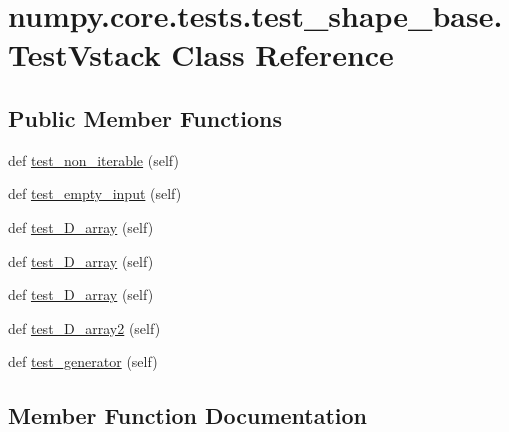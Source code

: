 \hypertarget{classnumpy_1_1core_1_1tests_1_1test__shape__base_1_1TestVstack}{}\section{numpy.\+core.\+tests.\+test\+\_\+shape\+\_\+base.\+Test\+Vstack Class Reference}
\label{classnumpy_1_1core_1_1tests_1_1test__shape__base_1_1TestVstack}
\subsection*{Public Member Functions}
\begin{DoxyCompactItemize}
\item 
def \hyperlink{classnumpy_1_1core_1_1tests_1_1test__shape__base_1_1TestVstack_a5e4099aa235d6b5fb95193a7cf2644e0}{test\+\_\+non\+\_\+iterable} (self)
\item 
def \hyperlink{classnumpy_1_1core_1_1tests_1_1test__shape__base_1_1TestVstack_a23dcd2e2281d12b0765589524287f886}{test\+\_\+empty\+\_\+input} (self)
\item 
def \hyperlink{classnumpy_1_1core_1_1tests_1_1test__shape__base_1_1TestVstack_ad06544a511cf11d5de3a956b7f20e661}{test\+\_\+D\+\_\+array} (self)
\item 
def \hyperlink{classnumpy_1_1core_1_1tests_1_1test__shape__base_1_1TestVstack_aba83d785f9d8cd5c15ff07dda5c37026}{test\+\_\+D\+\_\+array} (self)
\item 
def \hyperlink{classnumpy_1_1core_1_1tests_1_1test__shape__base_1_1TestVstack_a87e109b42dc560aa6d218f6da07a6b53}{test\+\_\+D\+\_\+array} (self)
\item 
def \hyperlink{classnumpy_1_1core_1_1tests_1_1test__shape__base_1_1TestVstack_a2ffa8429c2ec605e42c61d33055a41d9}{test\+\_\+D\+\_\+array2} (self)
\item 
def \hyperlink{classnumpy_1_1core_1_1tests_1_1test__shape__base_1_1TestVstack_a49eb63124428e63bf897aa39456291e5}{test\+\_\+generator} (self)
\end{DoxyCompactItemize}


\subsection{Member Function Documentation}
\mbox{\label{classnumpy_1_1core_1_1tests_1_1test__shape__base_1_1TestVstack_ad06544a511cf11d5de3a956b7f20e661}} 
